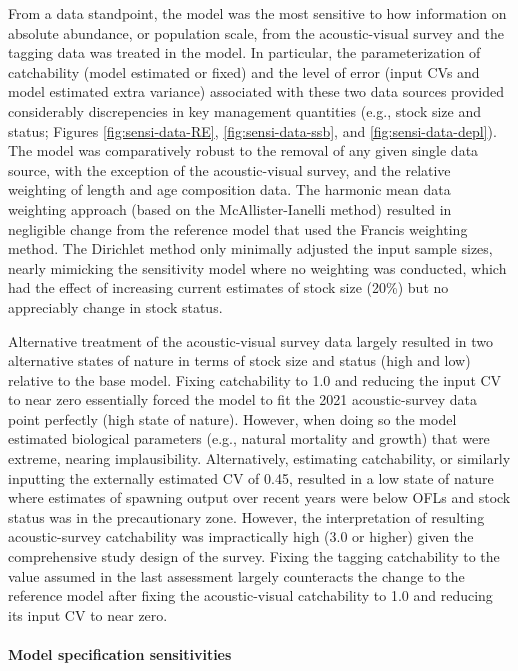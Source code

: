 \documentclass[11pt,
  english,
  letterpaper,
]{article}
\begin{document}
From a data standpoint, the model was the most sensitive to how information on absolute abundance, or population scale, from the acoustic-visual survey and the tagging data was treated in the model. In particular, the parameterization of catchability (model estimated or fixed) and the level of error (input CVs and model estimated extra variance) associated with these two data sources provided considerably discrepencies in key management quantities (e.g., stock size and status; Figures \ref{fig:sensi-data-RE}, \ref{fig:sensi-data-ssb}, and \ref{fig:sensi-data-depl}). The model was comparatively robust to the removal of any given single data source, with the exception of the acoustic-visual survey, and the relative weighting of length and age composition data. The harmonic mean data weighting approach (based on the McAllister-Ianelli method) resulted in negligible change from the reference model that used the Francis weighting method. The Dirichlet method only minimally adjusted the input sample sizes, nearly mimicking the sensitivity model where no weighting was conducted, which had the effect of increasing current estimates of stock size (20\%) but no appreciably change in stock status.

Alternative treatment of the acoustic-visual survey data largely resulted in two alternative states of nature in terms of stock size and status (high and low) relative to the base model. Fixing catchability to 1.0 and reducing the input CV to near zero essentially forced the model to fit the 2021 acoustic-survey data point perfectly (high state of nature). However, when doing so the model estimated biological parameters (e.g., natural mortality and growth) that were extreme, nearing implausibility. Alternatively, estimating catchability, or similarly inputting the externally estimated CV of 0.45, resulted in a low state of nature where estimates of spawning output over recent years were below OFLs and stock status was in the precautionary zone. However, the interpretation of resulting acoustic-survey catchability was impractically high (3.0 or higher) given the comprehensive study design of the survey. Fixing the tagging catchability to the value assumed in the last assessment largely counteracts the change to the reference model after fixing the acoustic-visual catchability to 1.0 and reducing its input CV to near zero.

\hypertarget{model-specification-sensitivities}{%
\paragraph{Model specification sensitivities}\label{model-specification-sensitivities}}
\end{document}

